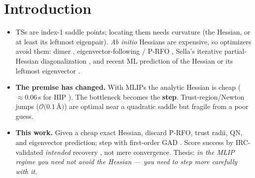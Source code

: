 \documentclass[11pt]{article}
\newcommand{\SI}[2]{#1\,\text{#2}}
\begin{document}
\section{Introduction}

\begin{itemize}
\item TSs are index-1 saddle points; locating them needs curvature (the Hessian,
  or at least its leftmost eigenpair). \emph{Ab initio} Hessians are expensive,
  so optimizers avoid them: dimer \cite{dimer}, eigenvector-following / P-RFO
  \cite{cerjanmiller,banerjee,baker}, Sella's iterative partial-Hessian
  diagonalization \cite{sella2019,sella2022}, and recent ML prediction of the
  Hessian \cite{newtonnet,hip} or its leftmost eigenvector \cite{lmhe}.
\item \textbf{The premise has changed.} With MLIPs the analytic Hessian is cheap
  ($\approx\!\SI{0.06}{s}$ for HIP \cite{hip}). The bottleneck becomes the
  \textbf{step}. Trust-region/Newton jumps ($\mathcal{O}(0.1\,$\AA$)$) are
  optimal near a quadratic saddle but fragile from a poor guess.
\item \textbf{This work.} Given a cheap exact Hessian, discard P-RFO, trust
  radii, QN, and eigenvector prediction; step with first-order GAD \cite{gad}.
  Score success by IRC-validated \emph{intended} recovery \cite{newtonnet,lmhe},
  not mere convergence. Thesis: \emph{in the MLIP regime you need not avoid the
  Hessian --- you need to step more carefully with it.}
\end{itemize}

\end{document}
